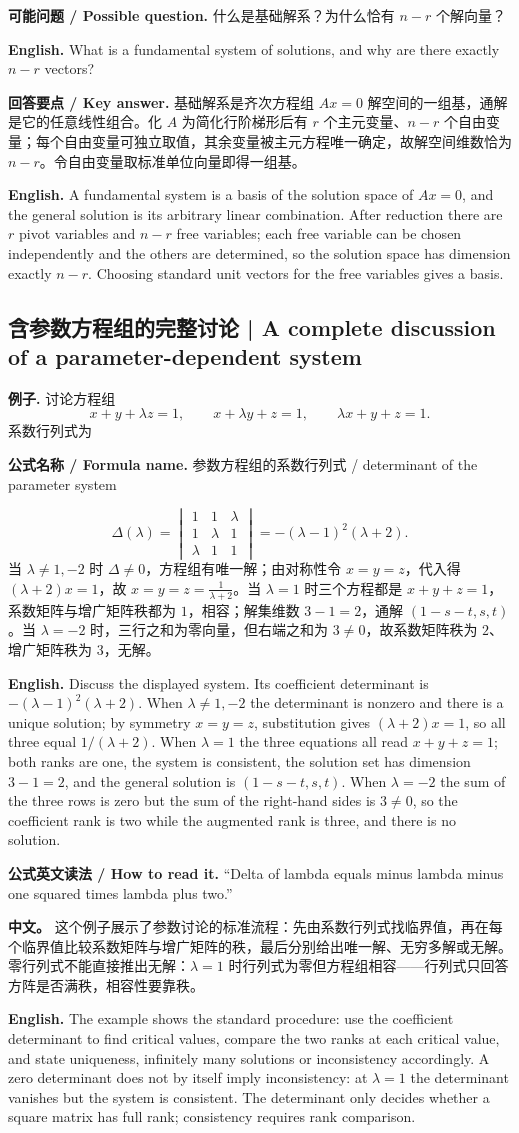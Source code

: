 \documentclass[UTF8,11pt,a4paper]{ctexart}
\newcommand{\EN}[1]{\par\noindent\textbf{English.} #1\par}
\newcommand{\READ}[1]{\par\noindent\textbf{公式英文读法 / How to read it.} #1\par}
\newcommand{\FORMULA}[2]{\par\noindent\textbf{公式名称 / Formula name.} #1 / #2\par}
\newcommand{\ASK}[4]{\par\noindent\textbf{可能问题 / Possible question.} #1\par\EN{#2}\noindent\textbf{回答要点 / Key answer.} #3\par\EN{#4}\medskip}
\newcommand{\APS}[2]{\par\noindent\textbf{中文。} #1\par\noindent\textbf{English.} #2\par\smallskip}
\begin{document}
\ASK{什么是基础解系？为什么恰有 $n-r$ 个解向量？}{What is a fundamental system of solutions, and why are there exactly $n-r$ vectors?}{基础解系是齐次方程组 $Ax=0$ 解空间的一组基，通解是它的任意线性组合。化 $A$ 为简化行阶梯形后有 $r$ 个主元变量、$n-r$ 个自由变量；每个自由变量可独立取值，其余变量被主元方程唯一确定，故解空间维数恰为 $n-r$。令自由变量取标准单位向量即得一组基。}{A fundamental system is a basis of the solution space of $Ax=0$, and the general solution is its arbitrary linear combination. After reduction there are $r$ pivot variables and $n-r$ free variables; each free variable can be chosen independently and the others are determined, so the solution space has dimension exactly $n-r$. Choosing standard unit vectors for the free variables gives a basis.}

\subsection{含参数方程组的完整讨论 | A complete discussion of a parameter-dependent system}
\noindent\textbf{例子.} 讨论方程组
\[
x+y+\lambda z=1,\qquad x+\lambda y+z=1,\qquad \lambda x+y+z=1.
\]
系数行列式为
\FORMULA{参数方程组的系数行列式}{determinant of the parameter system}
\[
\Delta(\lambda)=\begin{vmatrix}1&1&\lambda\\1&\lambda&1\\\lambda&1&1\end{vmatrix}
=-(\lambda-1)^2(\lambda+2).
\]
当 $\lambda\ne1,-2$ 时 $\Delta\ne0$，方程组有唯一解；由对称性令 $x=y=z$，代入得 $(\lambda+2)x=1$，故 $x=y=z=\frac{1}{\lambda+2}$。当 $\lambda=1$ 时三个方程都是 $x+y+z=1$，系数矩阵与增广矩阵秩都为 $1$，相容；解集维数 $3-1=2$，通解 $(1-s-t,s,t)$。当 $\lambda=-2$ 时，三行之和为零向量，但右端之和为 $3\ne0$，故系数矩阵秩为 $2$、增广矩阵秩为 $3$，无解。
\EN{Discuss the displayed system. Its coefficient determinant is $-(\lambda-1)^2(\lambda+2)$. When $\lambda\ne1,-2$ the determinant is nonzero and there is a unique solution; by symmetry $x=y=z$, substitution gives $(\lambda+2)x=1$, so all three equal $1/(\lambda+2)$. When $\lambda=1$ the three equations all read $x+y+z=1$; both ranks are one, the system is consistent, the solution set has dimension $3-1=2$, and the general solution is $(1-s-t,s,t)$. When $\lambda=-2$ the sum of the three rows is zero but the sum of the right-hand sides is $3\ne0$, so the coefficient rank is two while the augmented rank is three, and there is no solution.}
\READ{``Delta of lambda equals minus lambda minus one squared times lambda plus two.''}
\APS{这个例子展示了参数讨论的标准流程：先由系数行列式找临界值，再在每个临界值比较系数矩阵与增广矩阵的秩，最后分别给出唯一解、无穷多解或无解。零行列式不能直接推出无解：$\lambda=1$ 时行列式为零但方程组相容——行列式只回答方阵是否满秩，相容性要靠秩。}{The example shows the standard procedure: use the coefficient determinant to find critical values, compare the two ranks at each critical value, and state uniqueness, infinitely many solutions or inconsistency accordingly. A zero determinant does not by itself imply inconsistency: at $\lambda=1$ the determinant vanishes but the system is consistent. The determinant only decides whether a square matrix has full rank; consistency requires rank comparison.}
\end{document}
